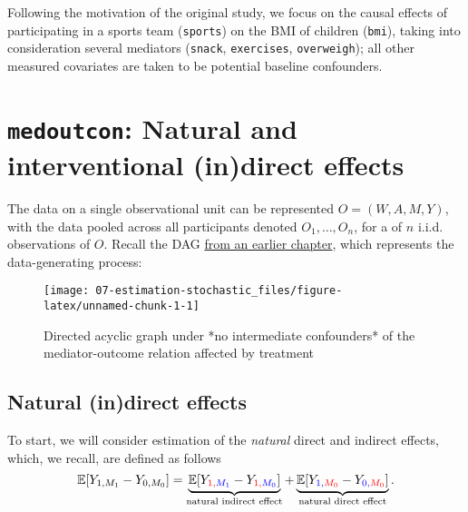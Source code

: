 \documentclass[
  12pt,
]{book}
\newcommand{\passthrough}[1]{#1}
\theoremstyle{definition}
\theoremstyle{definition}
\theoremstyle{definition}
\newcommand{\E}{\mathbb{E}}
\newcommand{\1}{\mathbbm{1}}
\begin{document}
Following the motivation of the original study, we focus on the causal effects
of participating in a sports team (\passthrough{\lstinline!sports!}) on the BMI of children (\passthrough{\lstinline!bmi!}),
taking into consideration several mediators (\passthrough{\lstinline!snack!}, \passthrough{\lstinline!exercises!}, \passthrough{\lstinline!overweigh!});
all other measured covariates are taken to be potential baseline confounders.

\hypertarget{medoutcon-natural-and-interventional-indirect-effects}{%
\section{\texorpdfstring{\texttt{medoutcon}: Natural and interventional (in)direct effects}{medoutcon: Natural and interventional (in)direct effects}}\label{medoutcon-natural-and-interventional-indirect-effects}}

The data on a single observational unit can be represented \(O = (W, A, M, Y)\),
with the data pooled across all participants denoted \(O_1, \ldots, O_n\), for a
of \(n\) i.i.d. observations of \(O\). Recall the DAG \protect\hyperlink{estimands}{from an earlier
chapter}, which represents the data-generating process:

\begin{figure}

{\centering \texttt{[image: 07-estimation-stochastic\_files/figure-latex/unnamed-chunk-1-1]} 

}

\caption{Directed acyclic graph under *no intermediate confounders* of the mediator-outcome relation affected by treatment}\label{fig:unnamed-chunk-1}
\end{figure}

\hypertarget{natural-indirect-effects}{%
\subsection{Natural (in)direct effects}\label{natural-indirect-effects}}

To start, we will consider estimation of the \emph{natural} direct and indirect effects,
which, we recall, are defined as follows
\begin{equation*}
  \E[Y_{1,M_1} - Y_{0,M_0}] = \underbrace{\E[Y_{\color{red}{1},\color{blue}{M_1}} -
    Y_{\color{red}{1},\color{blue}{M_0}}]}_{\text{natural indirect effect}} +
    \underbrace{\E[Y_{\color{blue}{1},\color{red}{M_0}} -
    Y_{\color{blue}{0},\color{red}{M_0}}]}_{\text{natural direct effect}}.
\end{equation*}
\end{document}
